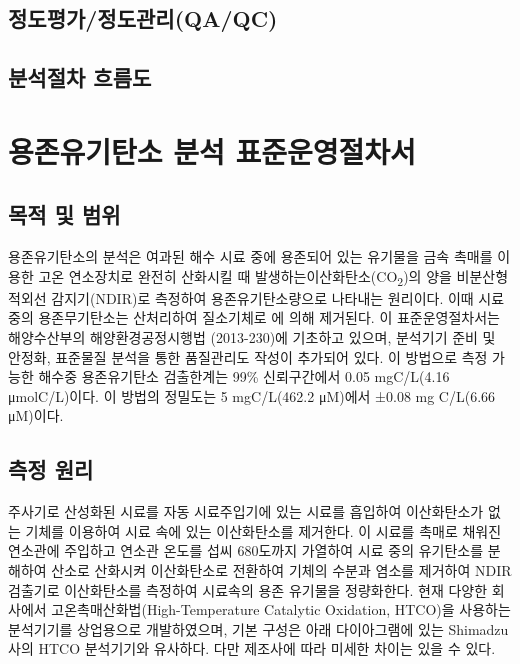 \documentclass[
]{book}
\begin{document}
\hypertarget{uxc815uxb3c4uxd3c9uxac00uxc815uxb3c4uxad00uxb9acqaqc-2}{%
\section{정도평가/정도관리(QA/QC)}\label{uxc815uxb3c4uxd3c9uxac00uxc815uxb3c4uxad00uxb9acqaqc-2}}

\hypertarget{uxbd84uxc11duxc808uxcc28-uxd750uxb984uxb3c4-2}{%
\section{분석절차 흐름도}\label{uxbd84uxc11duxc808uxcc28-uxd750uxb984uxb3c4-2}}

\hypertarget{uxc6a9uxc874uxc720uxae30uxd0c4uxc18c-uxbd84uxc11d-uxd45cuxc900uxc6b4uxc601uxc808uxcc28uxc11c}{%
\chapter{용존유기탄소 분석 표준운영절차서}\label{uxc6a9uxc874uxc720uxae30uxd0c4uxc18c-uxbd84uxc11d-uxd45cuxc900uxc6b4uxc601uxc808uxcc28uxc11c}}

\hypertarget{uxbaa9uxc801-uxbc0f-uxbc94uxc704-7}{%
\section{목적 및 범위}\label{uxbaa9uxc801-uxbc0f-uxbc94uxc704-7}}

용존유기탄소의 분석은 여과된 해수 시료 중에 용존되어 있는 유기물을 금속 촉매를 이용한 고온 연소장치로 완전히 산화시킬 때 발생하는이산화탄소(CO\textsubscript{2})의 양을 비분산형 적외선 감지기(NDIR)로 측정하여 용존유기탄소량으로 나타내는 원리이다. 이때 시료 중의 용존무기탄소는 산처리하여 질소기체로 에 의해 제거된다. 이 표준운영절차서는 해양수산부의 해양환경공정시행법 (2013-230)에 기초하고 있으며, 분석기기 준비 및 안정화, 표준물질 분석을 통한 품질관리도 작성이 추가되어 있다. 이 방법으로 측정 가능한 해수중 용존유기탄소 검출한계는 99\% 신뢰구간에서 0.05 mgC/L(4.16 μmolC/L)이다. 이 방법의 정밀도는 5 mgC/L(462.2 μM)에서 ±0.08 mg C/L(6.66 μM)이다.

\hypertarget{uxce21uxc815-uxc6d0uxb9ac-5}{%
\section{측정 원리}\label{uxce21uxc815-uxc6d0uxb9ac-5}}

주사기로 산성화된 시료를 자동 시료주입기에 있는 시료를 흡입하여 이산화탄소가 없는 기체를 이용하여 시료 속에 있는 이산화탄소를 제거한다. 이 시료를 촉매로 채워진 연소관에 주입하고 연소관 온도를 섭씨 680도까지 가열하여 시료 중의 유기탄소를 분해하여 산소로 산화시켜 이산화탄소로 전환하여 기체의 수분과 염소를 제거하여 NDIR 검출기로 이산화탄소를 측정하여 시료속의 용존 유기물을 정량화한다.
현재 다양한 회사에서 고온촉매산화법(High-Temperature Catalytic Oxidation, HTCO)을 사용하는 분석기기를 상업용으로 개발하였으며, 기본 구성은 아래 다이아그램에 있는 Shimadzu사의 HTCO 분석기기와 유사하다. 다만 제조사에 따라 미세한 차이는 있을 수 있다.
\end{document}
